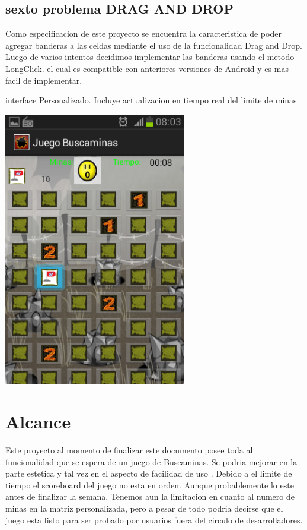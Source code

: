 \documentclass[11pt]{article} %
\begin{document}
\subsection{sexto problema DRAG AND DROP }

Como especificacion de este proyecto se encuentra la caracteristica de poder agregar banderas a las celdas mediante el uso de la funcionalidad Drag and Drop.
Luego de varios intentos decidimos implementar las banderas usando el metodo LongClick. el cual es compatible con anteriores versiones de Android y es mas facil de implementar.



\begin{center}
interface Personalizado. Incluye actualizacion en tiempo real del limite de minas 

\includegraphics[width=8cm]{imagenes/Screenshot_2013-12-11-08-03-31.png}
\end{center}



\section{Alcance}

Este proyecto al momento de finalizar este documento posee toda al funcionalidad que se espera de un juego de Buscaminas. Se podria mejorar en la parte estetica y tal vez en el aspecto de facilidad de uso . 
Debido a el limite de tiempo el scoreboard del juego no esta en orden. Aunque probablemente lo este antes de finalizar la semana. Tenemos aun la limitacion en cuanto al numero de minas en la matriz personalizada, pero a pesar de todo 
podria decirse que el juego esta listo para ser probado por usuarios fuera del circulo de desarrolladores.
\end{document}
